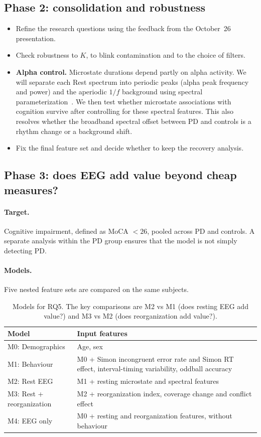 \documentclass[11pt,a4paper]{article}
\begin{document}
\subsection{Phase 2: consolidation and robustness}

\begin{itemize}
  \item Refine the research questions using the feedback from the October~26 presentation.
  \item Check robustness to $K$, to blink contamination and to the choice of filters.
  \item \textbf{Alpha control.} Microstate durations depend partly on alpha activity. We will separate each Rest spectrum into periodic peaks (alpha peak frequency and power) and the aperiodic $1/f$ background using spectral parameterization~\cite{donoghue2020}. We then test whether microstate associations with cognition survive after controlling for these spectral features. This also resolves whether the broadband spectral offset between PD and controls is a rhythm change or a background shift.
  \item Fix the final feature set and decide whether to keep the recovery analysis.
\end{itemize}

\subsection{Phase 3: does EEG add value beyond cheap measures?}

\paragraph{Target.} Cognitive impairment, defined as MoCA $<26$, pooled across PD and controls. A separate analysis within the PD group ensures that the model is not simply detecting PD.

\paragraph{Models.} Five nested feature sets are compared on the same subjects.

\begin{table}[h]
\centering
\small
\begin{tabularx}{\textwidth}{l L}
\toprule
Model & Input features \\
\midrule
M0: Demographics & Age, sex \\
M1: Behaviour & M0 + Simon incongruent error rate and Simon RT effect, interval-timing variability, oddball accuracy \\
M2: Rest EEG & M1 + resting microstate and spectral features \\
M3: Rest + reorganization & M2 + reorganization index, coverage change and conflict effect \\
M4: EEG only & M0 + resting and reorganization features, without behaviour \\
\bottomrule
\end{tabularx}
\caption{Models for RQ5. The key comparisons are M2 vs M1 (does resting EEG add value?) and M3 vs M2 (does reorganization add value?).}
\end{table}
\end{document}
